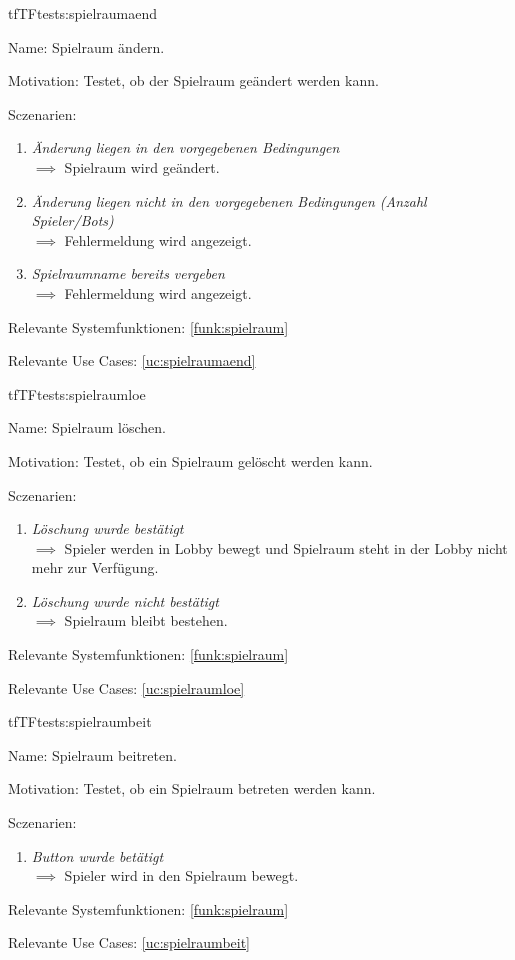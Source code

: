 \begin{description}[leftmargin=5em, style=sameline]
\begin{lhp}{tf}{TF}{tests:spielraumaend}
	\item [Name:] Spielraum ändern.
	\item [Motivation:] Testet, ob der Spielraum geändert werden kann.
	\item [Sczenarien:] \hfill
	\begin{enumerate}
		\item \textit{Änderung liegen in den vorgegebenen Bedingungen} \\ $\implies$ Spielraum wird geändert.
		\item \textit{Änderung liegen nicht in den vorgegebenen Bedingungen (Anzahl Spieler/Bots)} \\ $\implies$ Fehlermeldung wird angezeigt.
		\item \textit{Spielraumname bereits vergeben} \\ $\implies$ Fehlermeldung wird angezeigt.
	\end{enumerate}
	\item [Relevante Systemfunktionen:] \ref{funk:spielraum}
	\item [Relevante Use Cases:] \ref{uc:spielraumaend}
\end{lhp}

\begin{lhp}{tf}{TF}{tests:spielraumloe}
	\item [Name:] Spielraum löschen.
	\item [Motivation:] Testet, ob ein Spielraum gelöscht werden kann.
	\item [Sczenarien:] \hfill
	\begin{enumerate}
		\item \textit{Löschung wurde bestätigt} \\ $\implies$ Spieler werden in Lobby bewegt und Spielraum steht in der Lobby nicht mehr zur Verfügung.
		\item \textit{Löschung wurde nicht bestätigt} \\ $\implies$ Spielraum bleibt bestehen.
	\end{enumerate}
	\item [Relevante Systemfunktionen:] \ref{funk:spielraum}
	\item [Relevante Use Cases:] \ref{uc:spielraumloe}
\end{lhp}

\begin{lhp}{tf}{TF}{tests:spielraumbeit}
	\item [Name:] Spielraum beitreten.
	\item [Motivation:] Testet, ob ein Spielraum betreten werden kann.
	\item [Sczenarien:] \hfill
	\begin{enumerate}
		\item \textit{Button wurde betätigt} \\ $\implies$ Spieler wird in den Spielraum bewegt.
	\end{enumerate}
	\item [Relevante Systemfunktionen:] \ref{funk:spielraum}
	\item [Relevante Use Cases:] \ref{uc:spielraumbeit}
\end{lhp}



\end{description}
